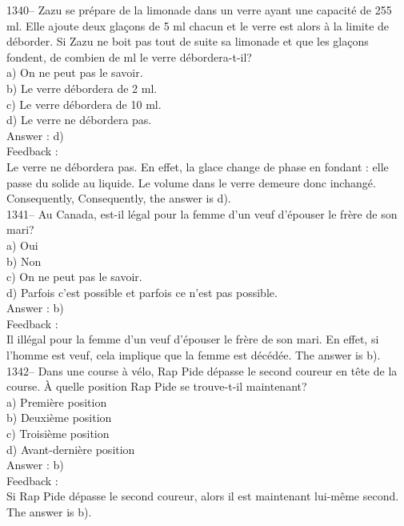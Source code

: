 \documentclass[letterpaper, 12pt]{article}
\begin{document}
1340-- Zazu se pr\'epare de la limonade dans un verre ayant une capacit\'e
de 255 ml.  Elle ajoute deux gla\c cons de 5 ml chacun et le verre est alors
\`a la limite de d\'eborder.  Si Zazu ne boit pas tout de suite sa limonade
et que les gla\c cons fondent, de combien de ml le verre d\'ebordera-t-il?\\
a) On ne peut pas le savoir.\\
b) Le verre d\'ebordera de 2 ml.\\
c) Le verre d\'ebordera de 10 ml.\\
d) Le verre ne d\'ebordera pas.\\

Answer : d)\\

Feedback : \\
Le verre ne d\'ebordera pas.  En effet, la glace change de phase en fondant
: elle passe du solide au liquide.  Le volume dans le verre demeure donc
inchang\'e.  Consequently, Consequently, the answer is d).\\

1341-- Au Canada, est-il l\'egal pour la femme d'un veuf d'\'epouser le
fr\`ere de son mari?\\
a) Oui\\
b) Non\\
c) On ne peut pas le savoir.\\
d) Parfois c'est possible et parfois ce n'est pas possible.\\

Answer : b)\\

Feedback : \\
Il ill\'egal pour la femme d'un veuf d'\'epouser le fr\`ere de son mari. En
effet, si l'homme est veuf, cela implique que la femme est d\'ec\'ed\'ee.
The answer is b).\\

1342-- Dans une course \`a v\'elo, Rap Pide d\'epasse le second coureur en
t\^ete de la course.  \`A quelle position Rap Pide se trouve-t-il
maintenant?\\
a) Premi\`ere position\\
b) Deuxi\`eme position\\
c) Troisi\`eme position\\
d) Avant-derni\`ere position\\

Answer : b)\\

Feedback : \\
Si Rap Pide d\'epasse le second coureur, alors il est maintenant lui-m\^eme
second.  The answer is b).\\
\end{document}
